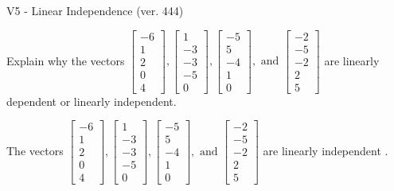 \begin{exercise}
  \begin{exerciseTitle}V5 - Linear Independence (ver. 444)\end{exerciseTitle}
  \begin{exerciseStatement}
    Explain why the vectors \(\left[\begin{array}{r}
-6 \\
1 \\
2 \\
0 \\
4
\end{array}\right] , \left[\begin{array}{r}
1 \\
-3 \\
-3 \\
-5 \\
0
\end{array}\right] , \left[\begin{array}{r}
-5 \\
5 \\
-4 \\
1 \\
0
\end{array}\right] , \text{ and } \left[\begin{array}{r}
-2 \\
-5 \\
-2 \\
2 \\
5
\end{array}\right]\) are linearly dependent or linearly independent.	


  \end{exerciseStatement}
  \begin{exerciseAnswer}
   The vectors \(\left[\begin{array}{r}
-6 \\
1 \\
2 \\
0 \\
4
\end{array}\right] , \left[\begin{array}{r}
1 \\
-3 \\
-3 \\
-5 \\
0
\end{array}\right] , \left[\begin{array}{r}
-5 \\
5 \\
-4 \\
1 \\
0
\end{array}\right] , \text{ and } \left[\begin{array}{r}
-2 \\
-5 \\
-2 \\
2 \\
5
\end{array}\right]\) are 
  	 linearly independent  .
  


  \end{exerciseAnswer}
\end{exercise}